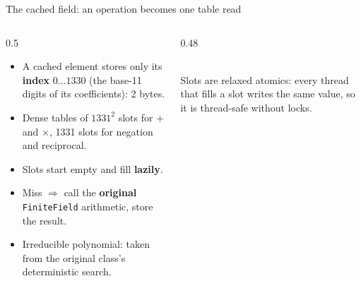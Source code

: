 \documentclass[aspectratio=169,11pt]{beamer}
\begin{document}
\begin{frame}{The cached field: an operation becomes one table read}
  \begin{columns}[T]
    \begin{column}{0.5\textwidth}
      \begin{itemize}
        \item A cached element stores only its \textbf{index} $0\ldots1330$
              (the base-11 digits of its coefficients): 2 bytes.
        \item Dense tables of $1331^2$ slots for $+$ and $\times$,
              1331 slots for negation and reciprocal.
        \item Slots start empty and fill \textbf{lazily}.
        \item Miss $\Rightarrow$ call the \textbf{original} \texttt{FiniteField} arithmetic,
              store the result.
        \item Irreducible polynomial: taken from the original class's deterministic search.
      \end{itemize}
    \end{column}
    \begin{column}{0.48\textwidth}
      \centering
      \\[0.8em]
      {\footnotesize Slots are relaxed atomics: every thread that fills a slot
       writes the same value, so it is thread-safe without locks.}
    \end{column}
  \end{columns}
\end{frame}
\end{document}
